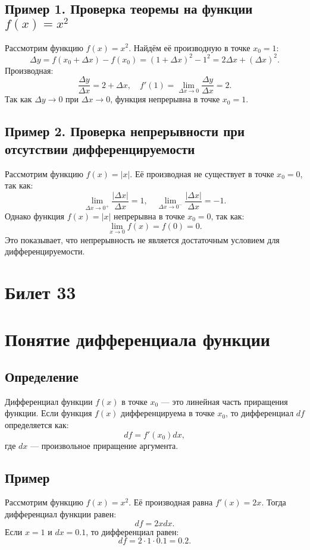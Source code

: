 \documentclass{article}
\begin{document}
\subsection{Пример 1. Проверка теоремы на функции \( f(x) = x^2 \)}
Рассмотрим функцию \( f(x) = x^2 \). Найдём её производную в точке \( x_0 = 1 \):
\[
\Delta y = f(x_0 + \Delta x) - f(x_0) = (1 + \Delta x)^2 - 1^2 = 2\Delta x + (\Delta x)^2.
\]
Производная:
\[
\frac{\Delta y}{\Delta x} = 2 + \Delta x, \quad f'(1) = \lim_{\Delta x \to 0} \frac{\Delta y}{\Delta x} = 2.
\]
Так как \( \Delta y \to 0 \) при \( \Delta x \to 0 \), функция непрерывна в точке \( x_0 = 1 \).

\subsection{Пример 2. Проверка непрерывности при отсутствии дифференцируемости}
Рассмотрим функцию \( f(x) = |x| \). Её производная не существует в точке \( x_0 = 0 \), так как:
\[
\lim_{\Delta x \to 0^+} \frac{|\Delta x|}{\Delta x} = 1, \quad \lim_{\Delta x \to 0^-} \frac{|\Delta x|}{\Delta x} = -1.
\]
Однако функция \( f(x) = |x| \) непрерывна в точке \( x_0 = 0 \), так как:
\[
\lim_{x \to 0} f(x) = f(0) = 0.
\]
Это показывает, что непрерывность не является достаточным условием для дифференцируемости.


\section{Билет 33}

\section*{Понятие дифференциала функции}

\subsection{Определение}
Дифференциал функции \( f(x) \) в точке \( x_0 \) — это линейная часть приращения функции. Если функция \( f(x) \) дифференцируема в точке \( x_0 \), то дифференциал \( df \) определяется как:
\[
df = f'(x_0) dx,
\]
где \( dx \) — произвольное приращение аргумента.

\subsection{Пример}
Рассмотрим функцию \( f(x) = x^2 \). Её производная равна \( f'(x) = 2x \). Тогда дифференциал функции равен:
\[
df = 2x dx.
\]
Если \( x = 1 \) и \( dx = 0.1 \), то дифференциал равен:
\[
df = 2 \cdot 1 \cdot 0.1 = 0.2.
\]
\end{document}
